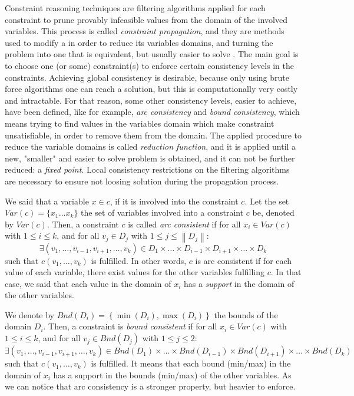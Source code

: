 Constraint reasoning techniques are filtering algorithms applied for each constraint to prune provably infeasible values from the domain of the involved variables. This process is called \textit{constraint propagation}, and they are methods used to modify a \CSP{} in order to reduce its variables domains, and turning the problem into one that is equivalent, but  usually easier to solve \cite{ChristianBessiere2006}. The main goal is to choose one (or some) constraint(s) to enforce certain consistency levels in the constraints. Achieving global consistency is desirable, because only using brute force algorithms one can reach a solution, but this is computationally very costly and intractable. %
For that reason, some other consistency levels, easier to achieve, have been defined, like for example, \textit{arc consistency} and \textit{bound consistency}, which means trying to find values in the variables domain which make constraint unsatisfiable, in order to remove them from the domain. The applied procedure to reduce the variable domains is called \textit{reduction function}, and it is applied until a new, "smaller" and easier to solve problem is obtained, and it can not be further reduced: a \textit{fixed point}. Local consistency restrictions on the filtering algorithms are necessary to ensure not loosing solution during the propagation process.

We said that a variable $x \in c$, if it is involved into the constraint $c$. Let the set $Var(c) = \{x_1\dots x_k\}$ the set of variables  involved into a constraint $c$ be, denoted by $Var(c)$. Then, a constraint $c$ is called \textit{arc consistent} if for all $x_i \in Var(c)$ with $1\leq i\leq k$, and for all $v_j \in D_j$ with $1\leq j\leq \left\|D_j\right\|$:
\[
\exists (v_1, \dots, v_{i-1}, v_{i+1},\dots, v_k) \in D_1\times\dots\times D_{i-1}\times D_{i+1}\times\dots\times D_k
\]
such that $c(v_1, \dots, v_k)$ is fulfilled. In other words, $c$ is arc consistent if for each value of each variable, there exist values for the other variables fulfilling $c$. In that case, we said that each value in the domain of $x_i$ has a \textit{support} in the domain of the other variables.

We denote by $Bnd(D_i) = \left\{\min(D_i), \max(D_i)\right\}$ the bounds of the domain $D_i$. Then, a constraint is \textit{bound consistent} if for all $x_i \in Var(c)$ with $1\leq i\leq k$, and for all $v_j \in Bnd(D_j)$ with $1\leq j\leq 2$:
\[
\exists (v_1, \dots, v_{i-1}, v_{i+1},\dots, v_k) \in Bnd\left(D_1\right)\times\dots\times Bnd\left(D_{i-1}\right)\times Bnd\left(D_{i+1}\right)\times\dots\times Bnd\left(D_k\right)
\]
such that $c(v_1, \dots, v_k)$ is fulfilled. It means that each bound (min/max) in the domain of $x_i$ has a support in the bounds (min/max) of the other variables. As we can notice that arc consistency is a stronger property, but heavier to enforce.

